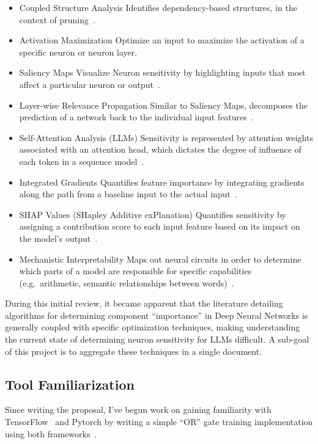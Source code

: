 \documentclass{article}
\begin{document}
    \begin{itemize}
        \item Coupled Structure Analysis
        \subitem Identifies dependency-based structures, in the context of pruning~\cite{ma2023llm}.
        \item Activation Maximization
        \subitem Optimize an input to maximize the activation of a specific neuron or neuron layer.
        \item Saliency Maps
        \subitem Visualize Neuron sensitivity by highlighting inputs that most affect a particular neuron or output~\cite{hsu2023explainable}.
        \item Layer-wise Relevance Propagation
        \subitem Similar to Saliency Maps, decomposes the prediction of a network back to the individual input features~\cite{jia2022interpreting}.
        \item Self-Attention Analysis (LLMs)
        \subitem Sensitivity is represented by attention weights associated with an attention head, which dictates the degree of influence of each token in a sequence model~\cite{shi2021sparsebert}.
        \item Integrated Gradients
        \subitem Quantifies feature importance by integrating gradients along the path from a baseline input to the actual input~\cite{sundararajan2017axiomatic}.
        \item SHAP Values (SHapley Additive exPlanation)
        \subitem Quantifies sensitivity by assigning a contribution score to each input feature based on its impact on the model’s output~\cite{nohara2022explanation}.
        \item Mechanistic Interpretability
        \subitem Maps out neural circuits in order to determine which parts of a model are responsible for specific capabilities (e.g.\ arithmetic, semantic relationships between words)~\cite{singh2024rethinking}.
    \end{itemize}

    During this initial review, it became apparent that the literature detailing algorithms for determining component
    ``importance'' in Deep Neural Networks is generally coupled with specific optimization techniques, making understanding the current state
    of determining neuron sensitivity for LLMs difficult.
    A sub-goal of this project is to aggregate these techniques in a single document.

    \subsection*{Tool Familiarization}
    Since writing the proposal, I've begun work on gaining familiarity with TensorFlow~\cite{tensorflow_2024} and
    Pytorch\cite{pytorch_2024} by writing a simple ``OR'' gate training implementation using both
    frameworks~\cite{seely_tensorflow_2024,seely2024perceptron}.
\end{document}
